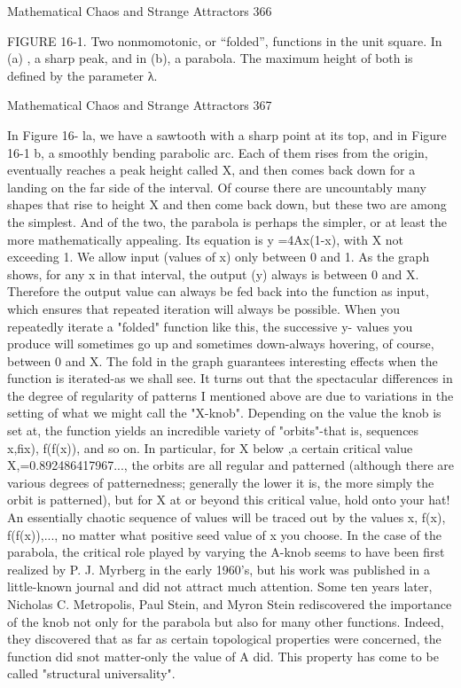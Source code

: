 Mathematical Chaos and Strange Attractors                                             366

      FIGURE 16-1. Two nonmomotonic, or “folded”, functions in the unit square.
      In (a) , a sharp peak, and in (b), a parabola. The maximum height of both is
      defined by the parameter λ.




Mathematical Chaos and Strange Attractors                                     367

              In Figure 16- la, we have a sawtooth with a sharp point at its top, and
      in Figure 16-1 b, a smoothly bending parabolic arc. Each of them rises from
      the origin, eventually reaches a peak height called X, and then comes back
      down for a landing on the far side of the interval. Of course there are
      uncountably many shapes that rise to height X and then come back down, but
      these two are among the simplest. And of the two, the parabola is perhaps the
      simpler, or at least the more mathematically appealing. Its equation is y
      =4Ax(1-x), with X not exceeding 1.
              We allow input (values of x) only between 0 and 1. As the graph
      shows, for any x in that interval, the output (y) always is between 0 and X.
      Therefore the output value can always be fed back into the function as input,
      which ensures that repeated iteration will always be possible. When you
      repeatedly iterate a "folded" function like this, the successive y- values you
      produce will sometimes go up and sometimes down-always hovering, of
      course, between 0 and X. The fold in the graph guarantees interesting effects
      when the function is iterated-as we shall see.
              It turns out that the spectacular differences in the degree of regularity
      of patterns I mentioned above are due to variations in the setting of what we
      might call the "X-knob". Depending on the value the knob is set at, the
      function yields an incredible variety of "orbits"-that is, sequences x,fix),
      f(f(x)), and so on. In particular, for X below ,a certain critical value
      X,=0.892486417967..., the orbits are all regular and patterned (although there
      are various degrees of patternedness; generally the lower it is, the more simply
      the orbit is patterned), but for X at or beyond this critical value, hold onto your
      hat! An essentially chaotic sequence of values will be traced out by the values
      x, f(x), f(f(x)),..., no matter what positive seed value of x you choose. In the
      case of the parabola, the critical role played by varying the A-knob seems to
      have been first realized by P. J. Myrberg in the early 1960's, but his work was
      published in a little-known journal and did not attract much attention. Some
      ten years later, Nicholas C. Metropolis, Paul Stein, and Myron Stein
      rediscovered the importance of the knob not only for the parabola but also for
      many other functions. Indeed, they discovered that as far as certain topological
      properties were concerned, the function did snot matter-only the value of A
      did. This property has come to be called "structural universality".

